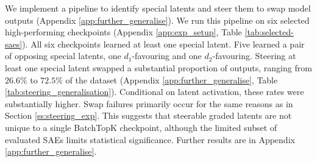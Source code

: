 

We implement a pipeline to identify special latents and steer them to swap model outputs (Appendix \ref{app:further_generalise}). We run this pipeline on six selected high-performing checkpoints (Appendix \ref{app:exp_setup}, Table \ref{tab:selected-saes}).
All six checkpoints learned at least one special latent. Five learned a pair of opposing special latents, one $d_1$-favouring and one $d_2$-favouring. Steering at least one special latent swapped a substantial proportion of outputs, ranging from $26.6\%$ to $72.5\%$ of the dataset (Appendix \ref{app:further_generalise}, Table \ref{tab:steering_generalisation}). Conditional on latent activation, these rates were substantially higher. Swap failures primarily occur for the same reasons as in Section \ref{ss:steering_exp}.
This suggests that steerable graded latents are not unique to a single BatchTopK checkpoint, although the limited subset of evaluated SAEs limits statistical significance.
Further results are in Appendix \ref{app:further_generalise}.
